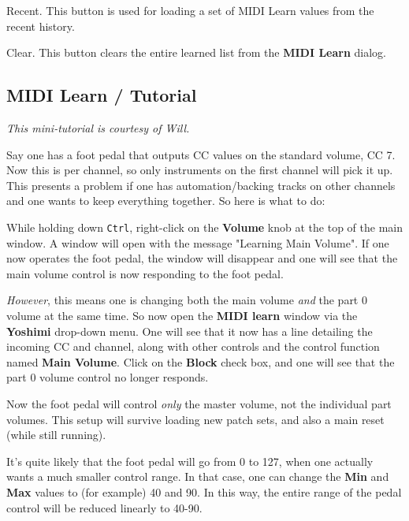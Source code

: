    Recent.
   This button is used for loading a set of
   MIDI Learn values from the recent history.

   Clear.
   This button clears the entire learned list from the
   \textbf{MIDI Learn} dialog.


\subsection{MIDI Learn / Tutorial}
\label{subsec:midi_learn_tutorial}

   \textsl{This mini-tutorial is courtesy of Will.}

   Say one has a foot pedal that outputs CC values on the standard volume, CC 7.
   Now this is per channel, so only instruments on the first channel will pick
   it up.  This presents a problem if one has automation/backing tracks on
   other channels and one wants to keep everything together. So here is what to
   do:

   While holding down \texttt{Ctrl}, right-click on the
   \textbf{Volume} knob at the top of the
   main window. A window will open with the message "Learning Main Volume".
   If one now operates the foot pedal, the window will disappear and one will
   see that the main volume control is now responding to the foot pedal.

   \textsl{However}, this means one is changing both the main volume
   \textsl{and} the part 0 volume at the same time.  So now open the
   \textbf{MIDI learn} window via the \textbf{Yoshimi} drop-down menu. One will
   see that it now has a line detailing the incoming CC and channel, along with
   other controls and the control function named \textbf{Main Volume}.  Click
   on the \textbf{Block} check box, and one will see that the part 0 volume
   control no longer responds.

   Now the foot pedal will control \textsl{only} the master volume, not the
   individual part volumes. This setup will survive loading new patch sets, and
   also a main reset (while still running).

   It's quite likely that the foot pedal will go from 0 to 127, when one actually
   wants a much smaller control range.  In that case, one can change the
   \textbf{Min} and \textbf{Max}
   values to (for example) 40 and 90.
   In this way, the entire range of the pedal control will be reduced linearly to
   40-90.


